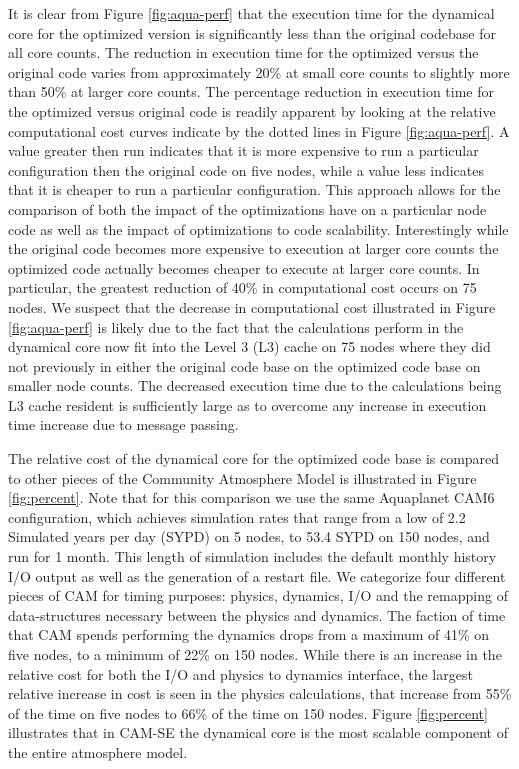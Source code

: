 It is clear from Figure \ref{fig:aqua-perf} that the execution time for the dynamical core for the optimized version is significantly less than the original codebase for all core counts. The reduction in execution time for the optimized versus the original code varies from approximately 20\% at small core counts to slightly more than 50\% at larger core counts. The percentage reduction in execution time for the optimized versus original code is readily apparent by looking at the relative computational cost curves indicate by the dotted lines in Figure \ref{fig:aqua-perf}.  A value greater then run indicates that it is more expensive to run a particular configuration then the original code on five nodes, while a value less indicates that it is cheaper to run a particular configuration.  This approach allows for the comparison of both the impact of the optimizations have on a particular node code as well as the impact of optimizations to code scalability.  Interestingly while the original code becomes more expensive to execution at larger core counts the optimized code actually becomes cheaper to execute at larger core counts.  In particular, the greatest reduction of 40\% in computational cost occurs on 75 nodes.  We suspect that the decrease in computational cost illustrated in Figure \ref{fig:aqua-perf} is likely due to the fact that the calculations perform in the dynamical core now fit into the Level 3 (L3) cache on 75 nodes where they did not previously in either the original code base on the optimized code base on smaller node counts.  The decreased execution time due to the calculations being L3 cache resident is sufficiently large as to overcome any increase in execution time increase due to message passing.  

The relative cost of the dynamical core for the optimized code base is compared to other pieces of the Community Atmosphere Model is illustrated in Figure \ref{fig:percent}.  Note that for this comparison we use the same Aquaplanet CAM6 configuration, which achieves simulation rates that range from a low of 2.2 Simulated years per day (SYPD) on 5 nodes, to 53.4 SYPD on 150 nodes, and run for 1 month. This length of simulation includes the default monthly history I/O output as well as the generation of a restart file. We categorize four different pieces of CAM for timing purposes: physics, dynamics, I/O and the remapping of data-structures necessary between the physics and dynamics.  The faction of time that CAM spends performing the dynamics drops from a maximum of 41\% on five nodes, to a minimum of 22\% on 150 nodes.  While there is an increase in the relative cost for both the I/O and physics to dynamics interface, the largest relative increase in cost is seen in the physics calculations, that increase from 55\% of the time on five nodes to 66\% of the time on 150 nodes.  Figure \ref{fig:percent} illustrates that in CAM-SE the dynamical core is the most scalable component of the entire atmosphere model.  


